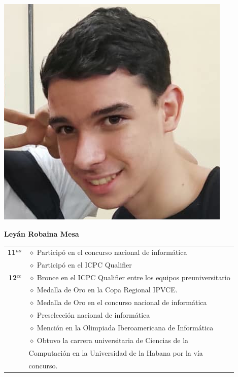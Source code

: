 \begin{minipage}{0.2\textwidth}
	\includegraphics[width=\linewidth]{img/concursantes/leyan.png} %
\end{minipage}
\hfill
\begin{minipage}{0.7\textwidth}
	\textbf{Leyán Robaina Mesa}
	
	\vspace*{0.1in}
	\begin{tabular}{rl}
		
	
		
		\textbf{11$^{no}$} & $\diamond$ Participó en el concurso nacional de informática \\
		                   & $\diamond$ Participó en el ICPC Qualifier \\
		
		\textbf{12$^{ce}$} & $\diamond$ Bronce en el ICPC Qualifier entre los equipos preuniversitario  \\
		& $\diamond$ Medalla de Oro en la Copa Regional IPVCE.  \\ 
		& $\diamond$ Medalla de Oro en el concurso nacional de informática\\
		& $\diamond$ Preselección nacional de informática  \\
		& $\diamond$ Mención en la Olimpiada Iberoamericana de Informática  \\
		&  $\diamond$ Obtuvo la carrera universitaria de Ciencias de la \\
		& Computación en la Universidad de la Habana por la vía \\
		& concurso. \\
		
		
	\end{tabular}
\end{minipage}

